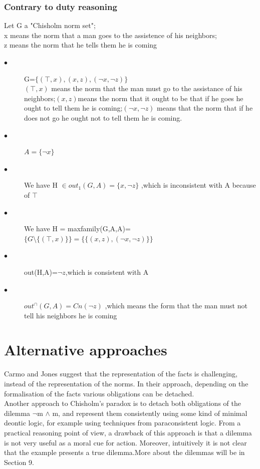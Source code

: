 \documentclass{article}
\begin{document}
\subsubsection{Contrary to duty reasoning}
Let G a "Chisholm norm set";\\
x means the norm that a man goes to the assistence of his neighbors;\\
z means the norm that he tells them he is coming\\
\begin{description}
\item[$\bullet$]G=$\{(\top ,x),(x,z),(\neg x,\neg z)  \}$\\
 $(\top ,x)$ means the norm that the man must go to the assistance of his neighbors;$(x,z)$means the norm that it ought to be that if he goes he ought to tell them he is coming;$(\neg x,\neg z)$ means that the norm that if he does not go he ought not to tell them he is coming.
 \item[$\bullet$] $A=\{ \neg x \}$
 \item[$\bullet$] We have H $\in out_{1}(G,A)=\{x,\neg z\}$ ,which is inconsistent with A because of $\top$
 \item[$\bullet$] We have  H = maxfamily(G,A,A)=$ \{ G\setminus \{(\top,x) \}\}=\{\{(x,z),(\neg x,\neg z)   \}\} $
 \item[$\bullet$] out(H,A)=$\neg z$,which is consistent with A
 \item[$\bullet$]$out^{\cap}(G,A)=Cn(\neg z)$ ,which means the form that the man must not tell his neighbors he is coming
\end{description}
\section{Alternative approaches}
Carmo and Jones \cite{6} suggest that the representation of the facts is challenging,
instead of the representation of the norms. In their approach, depending on the
formalisation of the facts various obligations can be detached.\\
Another approach to Chisholm’s paradox is to detach both obligations of the
dilemma  $\neg$m $\wedge$ m, and represent them consistently using some kind of minimal deontic logic, for example using techniques from paraconsistent logic. From a practical reasoning point of view, a drawback of this approach is that a dilemma is not very useful as a moral cue for action. Moreover, intuitively it is not clear that the example presents a true dilemma.More about the dilemmas will be in Section 9.\\
\end{document}
